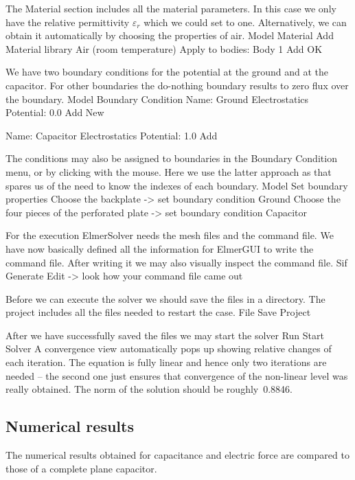 The Material section includes all the material parameters.
In this case we only have the relative permittivity $\varepsilon_r$ which we could set to one.
Alternatively, we can obtain it automatically by choosing the properties of air. 
\ttbegin
Model
  Material
    Add 
      Material library
        Air (room temperature)
      Apply to bodies: Body 1 
      Add 
      OK
\ttend


We have two boundary conditions for the potential at the ground and at the capacitor. For other boundaries the do-nothing boundary results to zero flux over the boundary.
\ttbegin
Model
  Boundary Condition
    Name: Ground
    Electrostatics
      Potential: 0.0
    Add
    New

    Name: Capacitor
    Electrostatics
      Potential: 1.0
    Add
\ttend   

The conditions may also be assigned to boundaries in the Boundary Condition menu, or
by clicking with the mouse. Here we use the latter approach as that spares us of the 
need to know the indexes of each boundary.
\ttbegin
Model
  Set boundary properties
    Choose the backplate -> set boundary condition Ground
    Choose the four pieces of the perforated plate -> set boundary condition Capacitor
\ttend

For the execution 
ElmerSolver needs the mesh files and the command file. We have now basically defined
all the information for ElmerGUI to write the command file. After writing it we may also visually 
inspect the command file.
\ttbegin
Sif 
  Generate
  Edit -> look how your command file came out  
\ttend

Before we can execute the solver we should save the files in a directory. The project includes
all the files needed to restart the case.
\ttbegin
File 
  Save Project
\ttend

After we have successfully saved the files we may start the solver
\ttbegin
Run
  Start Solver
\ttend
A convergence view automatically pops up showing relative changes of each iteration.
The equation is fully linear and hence only two iterations are needed -- the second 
one just ensures that convergence of the non-linear level was really obtained. 
The norm of the solution should be roughly~0.8846.


\subsection*{Numerical results}

The numerical results obtained for capacitance and electric force are compared
to those of a complete plane capacitor. 


